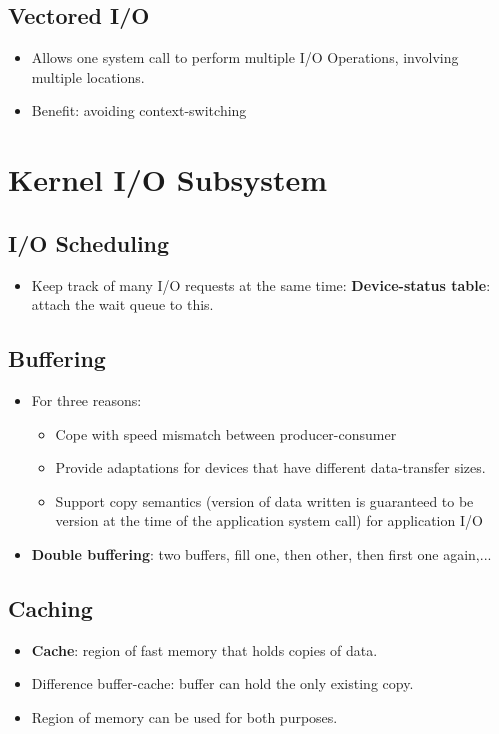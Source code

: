 \documentclass[10pt]{report}
\begin{document}
		\subsection{Vectored I/O}
			\begin{itemize}
				\item Allows one system call to perform multiple I/O Operations, involving multiple locations.
				\item Benefit: avoiding context-switching
			\end{itemize}

	\section{Kernel I/O Subsystem}
		\subsection{I/O Scheduling}
			\begin{itemize}
				\item Keep track of many I/O requests at the same time: \textbf{Device-status table}: attach the wait queue to this.
			\end{itemize}

		\subsection{Buffering}
			\begin{itemize}
				\item For three reasons:
				\begin{itemize}
					\item Cope with speed mismatch between producer-consumer
					\item Provide adaptations for devices that have different data-transfer sizes.
					\item Support copy semantics (version of data written is guaranteed to be version at the time of the application system call) for application I/O
				\end{itemize}
				\item \textbf{Double buffering}: two buffers, fill one, then other, then first one again,...
			\end{itemize}

		\subsection{Caching}
			\begin{itemize}
				\item \textbf{Cache}: region of fast memory that holds copies of data.
				\item Difference buffer-cache: buffer can hold the only existing copy.
				\item Region of memory can be used for both purposes.
			\end{itemize}
\end{document}
